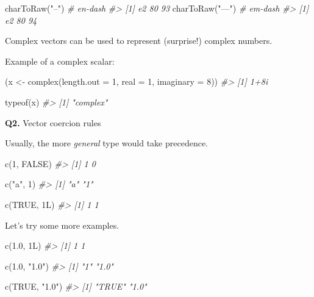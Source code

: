 \documentclass[
]{book}
\newenvironment{Shaded}{\begin{snugshade}}{\end{snugshade}}
\newcommand{\AttributeTok}[1]{\textcolor[rgb]{0.77,0.63,0.00}{#1}}
\newcommand{\CommentTok}[1]{\textcolor[rgb]{0.56,0.35,0.01}{\textit{#1}}}
\newcommand{\ConstantTok}[1]{\textcolor[rgb]{0.00,0.00,0.00}{#1}}
\newcommand{\DecValTok}[1]{\textcolor[rgb]{0.00,0.00,0.81}{#1}}
\newcommand{\FloatTok}[1]{\textcolor[rgb]{0.00,0.00,0.81}{#1}}
\newcommand{\FunctionTok}[1]{\textcolor[rgb]{0.00,0.00,0.00}{#1}}
\newcommand{\NormalTok}[1]{#1}
\newcommand{\OtherTok}[1]{\textcolor[rgb]{0.56,0.35,0.01}{#1}}
\newcommand{\StringTok}[1]{\textcolor[rgb]{0.31,0.60,0.02}{#1}}
\begin{document}
\begin{Shaded}
\begin{Highlighting}[]
\FunctionTok{charToRaw}\NormalTok{(}\StringTok{"–"}\NormalTok{) }\CommentTok{\# en{-}dash}
\CommentTok{\#\textgreater{} [1] e2 80 93}
\FunctionTok{charToRaw}\NormalTok{(}\StringTok{"—"}\NormalTok{) }\CommentTok{\# em{-}dash}
\CommentTok{\#\textgreater{} [1] e2 80 94}
\end{Highlighting}
\end{Shaded}

Complex vectors can be used to represent (surprise!) complex numbers.

Example of a complex scalar:

\begin{Shaded}
\begin{Highlighting}[]
\NormalTok{(x }\OtherTok{\textless{}{-}} \FunctionTok{complex}\NormalTok{(}\AttributeTok{length.out =} \DecValTok{1}\NormalTok{, }\AttributeTok{real =} \DecValTok{1}\NormalTok{, }\AttributeTok{imaginary =} \DecValTok{8}\NormalTok{))}
\CommentTok{\#\textgreater{} [1] 1+8i}

\FunctionTok{typeof}\NormalTok{(x)}
\CommentTok{\#\textgreater{} [1] "complex"}
\end{Highlighting}
\end{Shaded}

\textbf{Q2.} Vector coercion rules

Usually, the more \emph{general} type would take precedence.

\begin{Shaded}
\begin{Highlighting}[]
\FunctionTok{c}\NormalTok{(}\DecValTok{1}\NormalTok{, }\ConstantTok{FALSE}\NormalTok{)}
\CommentTok{\#\textgreater{} [1] 1 0}

\FunctionTok{c}\NormalTok{(}\StringTok{"a"}\NormalTok{, }\DecValTok{1}\NormalTok{)}
\CommentTok{\#\textgreater{} [1] "a" "1"}

\FunctionTok{c}\NormalTok{(}\ConstantTok{TRUE}\NormalTok{, 1L)}
\CommentTok{\#\textgreater{} [1] 1 1}
\end{Highlighting}
\end{Shaded}

Let's try some more examples.

\begin{Shaded}
\begin{Highlighting}[]
\FunctionTok{c}\NormalTok{(}\FloatTok{1.0}\NormalTok{, 1L)}
\CommentTok{\#\textgreater{} [1] 1 1}

\FunctionTok{c}\NormalTok{(}\FloatTok{1.0}\NormalTok{, }\StringTok{"1.0"}\NormalTok{)}
\CommentTok{\#\textgreater{} [1] "1"   "1.0"}

\FunctionTok{c}\NormalTok{(}\ConstantTok{TRUE}\NormalTok{, }\StringTok{"1.0"}\NormalTok{)}
\CommentTok{\#\textgreater{} [1] "TRUE" "1.0"}
\end{Highlighting}
\end{Shaded}
\end{document}
